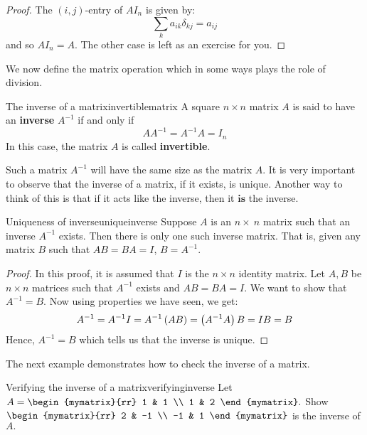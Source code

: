 \begin{proof}
The $(i,j)$-entry of $AI_n$ is given by:
\begin{equation*}
\sum_{k}a_{ik}\delta _{kj}=a_{ij}
\end{equation*}
and so $AI_{n}=A.$ The other case is left as an exercise for you. 
\end{proof}

We now define the matrix operation which in some ways plays the role of division. 

\begin{definition}{The inverse of a matrix}{invertiblematrix}
A square  $n\times n$ matrix $A$ is said to have an \textbf{inverse} $A^{-1}$
if and only if 
\begin{equation*}
AA^{-1}=A^{-1}A=I_n
\end{equation*}
In this case, the matrix $A$ is called
 \textbf{invertible}.
\end{definition}

Such a  matrix $A^{-1}$ will have the same size as the matrix $A$. 
It is very important to observe that the inverse of a matrix, if it exists,
is unique. Another way to think of this is that if it acts like the inverse,
then it $\textbf{is}$ the inverse.

\begin{theorem}{Uniqueness of inverse}{uniqueinverse}
Suppose $A$ is an $n \times\ n$ matrix such that an inverse  $A^{-1}$ exists. Then there is only one such 
inverse matrix. 
That is, given any matrix $B$ such that $AB=BA=I$, $B=A^{-1}$.
\end{theorem}

\begin{proof} In this proof, it is assumed that $I$ is the $n \times n$ identity matrix. 
Let $A, B$ be $n \times n$ matrices such that $A^{-1}$ exists and $AB=BA=I$. 
We want to show that $A^{-1} = B$. 
Now using properties we have seen, we get: 
\begin{equation*}
A^{-1}=A^{-1}I=A^{-1}\left(AB\right) =\left(A^{-1}A\right) B=IB=B
\end{equation*}
Hence, $A^{-1} = B$ which tells us that the inverse is unique.
\end{proof}

The next example demonstrates how to check the inverse of a matrix. 

\begin{example}{Verifying the inverse of a matrix}{verifyinginverse}
Let $A=\begin{mymatrix}{rr}
1 & 1 \\
1 & 2
\end{mymatrix} .$ Show $\begin{mymatrix}{rr}
2 & -1 \\
-1 & 1
\end{mymatrix} $ is the inverse of $A.$
\end{example}


